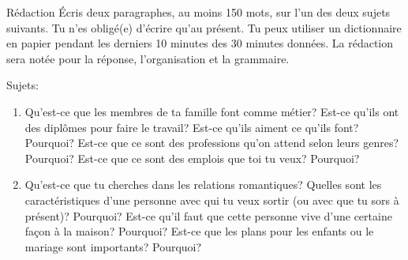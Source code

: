 \begin{frame}{Rédaction}
  \small
  Écris deux paragraphes, au moins 150 mots, sur l'un des deux sujets suivants.
  Tu n'es obligé(e) d'écrire qu'\alert{au présent}.
  Tu peux utiliser un dictionnaire en papier \alert{pendant les derniers 10 minutes} des 30 minutes données.
  La rédaction sera notée pour la réponse, l'organisation et la grammaire.

  Sujets:
  \begin{enumerate}
    \item Qu'est-ce que les membres de ta famille font comme métier? Est-ce qu'ils ont des diplômes pour faire le travail? Est-ce qu'ils aiment ce qu'ils font? Pourquoi? Est-ce que ce sont des professions qu'on attend selon leurs genres? Pourquoi? Est-ce que ce sont des emplois que toi tu veux? Pourquoi?
    \item Qu'est-ce que tu cherches dans les relations romantiques? Quelles sont les caractéristiques d'une personne avec qui tu veux sortir (ou avec que tu sors à présent)? Pourquoi? Est-ce qu'il faut que cette personne vive d'une certaine façon à la maison? Pourquoi? Est-ce que les plans pour les enfants ou le mariage sont importants? Pourquoi?
  \end{enumerate}
\end{frame}